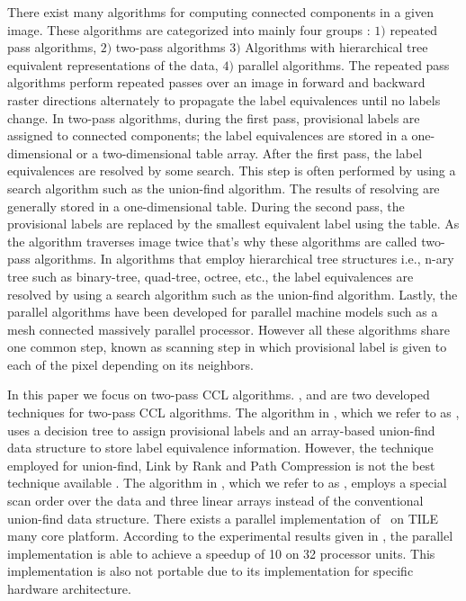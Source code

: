 There exist many algorithms for computing connected components in a given image. These algorithms are categorized into
mainly four groups %
\cite{Suzuki2003_Linear}
: $1)$ repeated pass
algorithms\cite{Haralick1981_Repeated,Hashizume1990_Algorithm}, $2)$ two-pass
algorithms\cite{gotoh1990high,gotoh1987component,komeichi1989video,lumia1983new,lumia1983new_c,naoi1995high,rosenfeld1970connectivity,
rosenfeld1966sequential,shirai1987labeling}
$3)$ Algorithms with hierarchical tree equivalent representations of the
data\cite{dillencourt1992general,gargantini1982separation,hecquard1991connected,samet1981connected,samet1985computing,samet1988efficient,
samet1986improved,tamminen1984efficient},
$4)$ parallel
algorithms\cite{bhattacharya1996connected,choudhary1994connected,
hirschberg1979computing,manohar1989connected,nassimi1980finding,olariu1993fast}.
The repeated pass algorithms perform repeated passes over an image in forward and backward raster directions alternately
to propagate the label equivalences until no labels change.
In two-pass algorithms, during the first pass, provisional labels are assigned to connected components;
the label equivalences are stored in a one-dimensional or a two-dimensional table array. After the first pass, the label 
equivalences are resolved by some search. This step is often performed by using
a search algorithm such as the union-find algorithm.
The results of resolving are generally stored in a one-dimensional table. During the second pass, the provisional labels are 
replaced by the smallest equivalent label using the table. As the algorithm traverses image twice that's why these algorithms 
are called two-pass algorithms.
In algorithms that employ hierarchical tree structures i.e., n-ary tree such as binary-tree, quad-tree, octree, etc., the
label equivalences are resolved by using a search algorithm such as the union-find algorithm.
Lastly, the parallel algorithms have been developed for parallel machine models such as a mesh connected massively parallel processor.
However all these algorithms share one common step, known as scanning step in
which provisional label is given to each of the pixel depending on its neighbors.

In this paper we focus on two-pass CCL algorithms. \cite{Wu2009_LRPC}, and \cite{He2012_ARun} are two
developed techniques for two-pass CCL algorithms.
The algorithm in \cite{Wu2009_LRPC}, which we refer to as \lrpc, uses a decision tree to assign provisional labels and an 
array-based union-find data structure
to store label equivalence information. However, the technique employed for
union-find, Link by Rank and Path Compression is not the best technique available \cite{Patwary2012_PARemSP}. 
The algorithm in \cite{He2012_ARun}, which we refer to as \arun, employs a special scan order over the data and three linear
arrays instead of the conventional union-find data structure. There
exists a parallel implementation of \arun\ on TILE many core
platform\cite{Chen2013_PARun}. According to the
experimental results given in \cite{Chen2013_PARun}, the parallel implementation is able to achieve a speedup of 10 on
32 processor units. 
This implementation is also not portable due to its implementation for specific hardware architecture.

